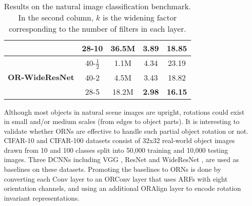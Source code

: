 \documentclass[10pt,twocolumn,letterpaper]{article}
\begin{document}
\begin{table}
\begin{center}
\begin{tabular}{|l|cccc|}
                                                 & 28-10   & 36.5M  & 3.89          & 18.85          \\ \hline
                \multirow{4}{*}{\textbf{OR-WideResNet}}  & 40-$\tfrac{1}{2}$    & 1.1M   & 4.34          & 23.19              \\
                                                 & 40-2    & 4.5M   & 3.43          & 18.82          \\
                                                 & 28-5    & 18.2M  & \textbf{2.98} & \textbf{16.15} \\ \hline
        \end{tabular}
        \end{center}
        \caption{
            Results on the natural image classification benchmark. In the second column, $k$ is the widening factor corresponding to the number of filters in each layer.
        }
    \label{tab:CIFAR}
    \vspace{-1em}
    \end{table}

\label{sec:CIFAR}
    Although most objects in natural scene images are upright, rotations could exist in small and/or medium scales (from edges to object parts). It is interesting to validate whether ORNs are effective to handle such partial object rotation or not.
    CIFAR-10 and CIFAR-100 datasets \cite{Krizhevsky2009} consist of 32x32 real-world object images drawn from 10 and 100 classes split into 50,000 training and 10,000 testing images. Three DCNNs including VGG \cite{Simonyan2014}, ResNet \cite{He2015} and WideResNet \cite{Zagoruyko2016}, are used as baselines on these datasets. Promoting the baselines to ORNs is done by converting each Conv layer to an ORConv layer that uses ARFs with eight orientation channels, and using an additional ORAlign layer to encode rotation invariant representations.
\end{document}
